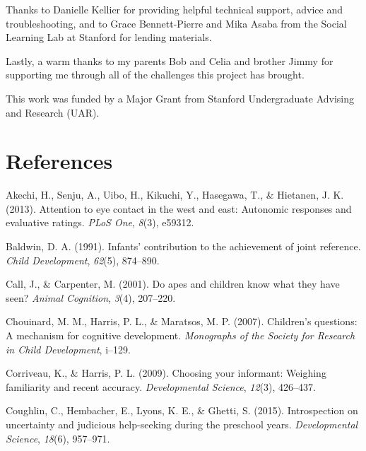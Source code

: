 \documentclass[,man,floatsintext]{apa6}
\begin{document}
Thanks to Danielle Kellier for providing helpful technical support, advice and troubleshooting, and to Grace Bennett-Pierre and Mika Asaba from the Social Learning Lab at Stanford for lending materials.

Lastly, a warm thanks to my parents Bob and Celia and brother Jimmy for supporting me through all of the challenges this project has brought.

This work was funded by a Major Grant from Stanford Undergraduate Advising and Research (UAR).

\newpage

\hypertarget{references}{%
\section{References}\label{references}}

\setlength{\parindent}{-0.5in}
\setlength{\leftskip}{0.5in}

\hypertarget{refs}{}
\leavevmode\hypertarget{ref-akechi2013attention}{}%
Akechi, H., Senju, A., Uibo, H., Kikuchi, Y., Hasegawa, T., \& Hietanen, J. K. (2013). Attention to eye contact in the west and east: Autonomic responses and evaluative ratings. \emph{PLoS One}, \emph{8}(3), e59312.

\leavevmode\hypertarget{ref-baldwin1991infants}{}%
Baldwin, D. A. (1991). Infants' contribution to the achievement of joint reference. \emph{Child Development}, \emph{62}(5), 874--890.

\leavevmode\hypertarget{ref-call2001apes}{}%
Call, J., \& Carpenter, M. (2001). Do apes and children know what they have seen? \emph{Animal Cognition}, \emph{3}(4), 207--220.

\leavevmode\hypertarget{ref-chouinard2007children}{}%
Chouinard, M. M., Harris, P. L., \& Maratsos, M. P. (2007). Children's questions: A mechanism for cognitive development. \emph{Monographs of the Society for Research in Child Development}, i--129.

\leavevmode\hypertarget{ref-corriveau2009choosing}{}%
Corriveau, K., \& Harris, P. L. (2009). Choosing your informant: Weighing familiarity and recent accuracy. \emph{Developmental Science}, \emph{12}(3), 426--437.

\leavevmode\hypertarget{ref-coughlin2015introspection}{}%
Coughlin, C., Hembacher, E., Lyons, K. E., \& Ghetti, S. (2015). Introspection on uncertainty and judicious help-seeking during the preschool years. \emph{Developmental Science}, \emph{18}(6), 957--971.
\end{document}
